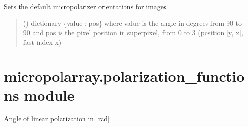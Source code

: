 \documentclass[letterpaper,10pt,english]{sphinxmanual}
\begin{document}
\begin{fulllineitems}
\label{\detokenize{micropolarray:micropolarray.micropol_image.set_default_angles}}
\pysigstartsignatures
{}
\pysigstopsignatures
\sphinxAtStartPar
Sets the default micropolarizer orientations for images.
\begin{quote}\begin{description}
\sphinxAtStartPar
{} () \textendash{} dictionary \{value : pos\} where value is the angle in degrees from \sphinxhyphen{}90 to 90 and pos is the pixel position in superpixel, from 0 to 3 (position {[}y, x{]}, fast index x)

\end{description}\end{quote}

\end{fulllineitems}



\section{micropolarray.polarization\_functions module}
\label{\detokenize{micropolarray:module-micropolarray.polarization_functions}}\label{\detokenize{micropolarray:micropolarray-polarization-functions-module}}

\begin{fulllineitems}
\label{\detokenize{micropolarray:micropolarray.polarization_functions.AoLP}}
\pysigstartsignatures
{}
\pysigstopsignatures
\sphinxAtStartPar
Angle of linear polarization in {[}rad{]}

\end{fulllineitems}
\end{document}
